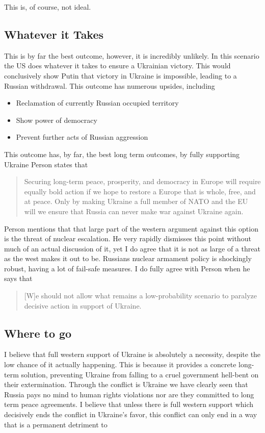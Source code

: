 \documentclass{article}
\begin{document}
        This is, of course, not ideal. 

    \subsection{Whatever it Takes}
        This is by far the best outcome, however, it is incredibly unlikely. In this scenario the US does whatever it takes to ensure a Ukrainian victory. This would conclusively show Putin that victory in Ukraine is impossible, leading to a Russian withdrawal. This outcome has numerous upsides, including 
            \begin{itemize}
                \item Reclamation of currently Russian occupied territory 
                \item Show power of democracy
                \item Prevent further acts of Russian aggression 
            \end{itemize}
        This outcome has, by far, the best long term outcomes, by fully supporting Ukraine Person states that 

        \begin{quote}
            Securing long-term peace, prosperity, and democracy in Europe will require equally bold action if we hope to restore a Europe that is whole, free, and at peace. Only by making Ukraine a full member of NATO and the EU will we ensure that Russia can never make war against Ukraine again.
        \end{quote}

        Person mentions that that large part of the western argument against this option is the threat of nuclear escalation. He very rapidly dismisses this point without much of an actual discussion of it, yet I do agree that it is not as large of a threat as the west makes it out to be. Russians nuclear armament policy is shockingly robust, having a lot of fail-safe measures. I do fully agree with Person when he says that 

        \begin{quote}
            [W]e should not allow what remains a low-probability scenario to paralyze decisive action in support of Ukraine.
        \end{quote}
        
    \subsection{Where to go}
        I believe that full western support of Ukraine is absolutely a necessity, despite the low chance of it actually happening. This is because it provides a concrete long-term solution, preventing Ukraine from falling to a cruel government hell-bent on their extermination. Through the conflict is Ukraine we have clearly seen that Russia pays no mind to human rights violations nor are they committed to long term peace agreements. I believe that unless there is full western support which decisively ends the conflict in Ukraine's favor, this conflict can only end in a way that is a permanent detriment to 
\end{document}
